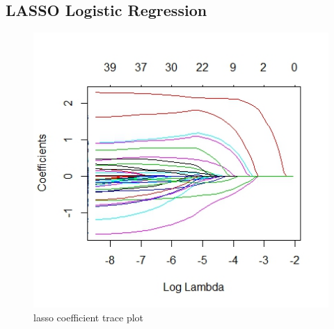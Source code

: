\documentclass{article} %
\begin{document}
\subsection{LASSO Logistic Regression}
\begin{figure}[h]
\begin{center}
   \includegraphics[scale = 0.5]{lassotraceplot.jpg}
\end{center}
\caption{lasso coefficient trace plot}
\end{figure}
\end{document}
